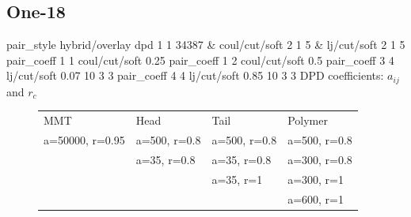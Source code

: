 \documentclass[a4paper]{article}
\begin{document}
\subsection*{One-18}
pair\_style hybrid/overlay dpd 1 1 34387 \& coul/cut/soft 2 1 5 \& 
lj/cut/soft 2 1 5\newline
pair\_coeff 1 1 coul/cut/soft 0.25
pair\_coeff 1 2 coul/cut/soft 0.5\newline
pair\_coeff 3 4 lj/cut/soft 0.07    10 3 3\newline
pair\_coeff 4 4 lj/cut/soft 0.85    10 3 3\newline
DPD coefficients: $a_{ij}$ and $r_c$
\begin{figure}[H]\begin{tabular}{llll}
MMT             & Head         & Tail         & Polymer      \\
a=50000, r=0.95 & a=500, r=0.8 & a=500, r=0.8 & a=500, r=0.8 \\
                & a=35,  r=0.8 & a=35,  r=0.8 & a=300, r=0.8 \\
                &              & a=35,  r=1   & a=300, r=1   \\
                &              &              & a=600, r=1   \\
\end{tabular}\end{figure}
\end{document}
